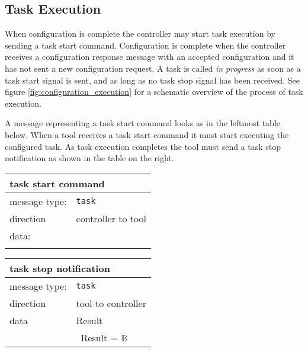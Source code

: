 \documentclass{article}
\newcommand{\msg}[1]{\texttt{#1}}
\begin{document}
  \subsection{Task Execution} \label{ss::task_execution}

   When configuration is complete the controller may start task execution by
   sending a task start command. Configuration is complete when the controller
   receives a configuration response message with an accepted configuration and
   it has not sent a new configuration request.  A task is called \textit{in
   progress} as soon as a task start signal is sent, and as long as no task
   stop signal has been received. See figure \ref{fig:configuration_execution}
   for a schematic overview of the process of task execution.

   A message representing a task start command looks as in the leftmost table
   below.  When a tool receives a task start command it must start executing
   the configured task. As task execution completes the tool must send a task
   stop notification as shown in the table on the right.

   \begin{table}[H]
    \begin{center}
     \begin{tabular}{|ll|}
      \hline
       \multicolumn{2}{|l|}{\textbf{task start command}} \\
      \hline
       message type:   & \msg{task} \\
      \hline
       direction       & controller to tool \\
       data:           & \\
                       & \\
      \hline
     \end{tabular}
     \begin{tabular}{|ll|}
      \hline
       \multicolumn{2}{|l|}{\textbf{task stop notification}} \\
      \hline
       message type:   & \msg{task} \\
      \hline
       direction       & tool to controller \\
       data            & Result \\
                       & \ Result = $\mathbb{B}$ \\
      \hline
     \end{tabular}
    \end{center}
    \vspace{-0.3cm}
   \end{table}
\end{document}
